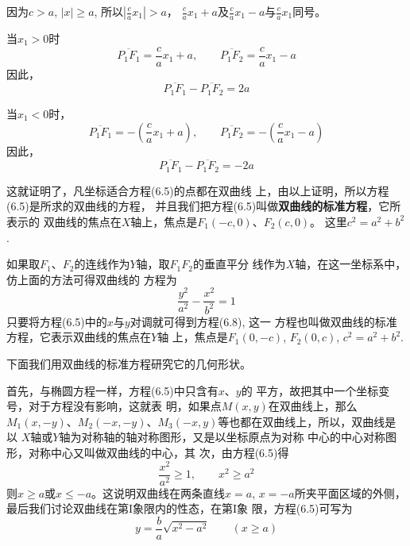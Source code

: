 因为$c>a$, $|x|\ge a$, 所以$\left|\frac{c}{a}x_1\right|>a$，
$\frac{c}{a}x_1+a$及$\frac{c}{a}x_1-a$与$\frac{c}{a}x_1$同号。

当$x_1>0$时
\[\overline{P_1F_1}=\frac{c}{a}x_1+a,\qquad \overline{P_1F_2}=\frac{c}{a}x_1-a\]
因此，
\[\overline{P_1F_1}-\overline{P_1F_2}=2a\]

当$x_1<0$时，
\[\overline{P_1F_1}=-\left(\frac{c}{a}x_1+a\right),\qquad \overline{P_1F_2}=-\left(\frac{c}{a}x_1-a\right)\]
因此，
\[\overline{P_1F_1}-\overline{P_1F_2}=-2a\]

这就证明了，凡坐标适合方程(6.5)的点都在双曲线
上，由以上证明，所以方程(6.5)是所求的双曲线的方程，
并且我们把方程(6.5)叫做\textbf{双曲线的标准方程}，它所表示的
双曲线的焦点在$X$轴上，焦点是$F_1(-c,0)$、$F_2(c,0)$。
这里$c^2=a^2+b^2$.

如果取$F_1$、$F_2$的连线作为$Y$轴，取$F_1F_2$的垂直平分
线作为$X$轴，在这一坐标系中，仿上面的方法可得双曲线的
方程为
\begin{equation}
    \boxed{\frac{y^2}{a^2}-\frac{x^2}{b^2}=1}
\end{equation}
只要将方程(6.5)中的$x$与$y$对调就可得到方程(6.8), 这一
方程也叫做双曲线的标准方程，它表示双曲线的焦点在$Y$轴
上，焦点是$F_1(0,-c)$, $F_2(0,c)$, $c^2=a^2+b^2$.

下面我们用双曲线的标准方程研究它的几何形状。

首先，与椭圆方程一样，方程(6.5)中只含有$x$、$y$的
平方，故把其中一个坐标变号，对于方程没有影响，这就表
明，如果点$M(x,y)$在双曲线上，那么$M_1(x,-y)$、$M_2(-x,
-y)$、$M_3(-x,y)$等也都在双曲线上，所以，双曲线是以
$X$轴或$Y$轴为对称轴的轴对称图形，又是以坐标原点为对称
中心的中心对称图形，对称中心又叫做双曲线的中心，其
次，由方程(6.5)得
\[\frac{x^2}{a^2}\ge 1,\qquad x^2\ge a^2\]
则$x\ge a$或$x\le -a$。这说明双曲线在两条直线$x=a$, $x=-a$所夹平面区域的外侧，最后我们讨论双曲线在第I象限内的性态，在第I象
限，方程(6.5)可写为
\[y=\frac{b}{a}\sqrt{x^2-a^2}\qquad (x\ge a)\]

\begin{figure}[htp]
    \centering
{}
    \caption{}
\end{figure}

